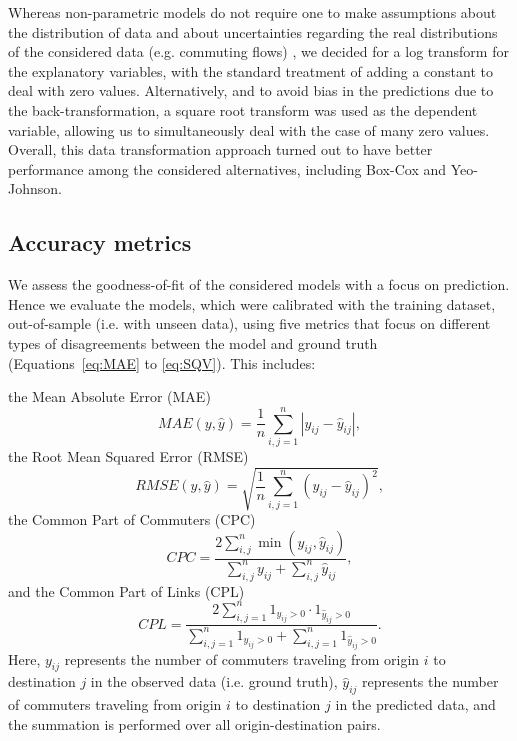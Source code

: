 Whereas non-parametric models do not require one to make assumptions about the distribution of data and about uncertainties regarding the real distributions of the considered data (e.g. commuting flows) \citep{Farmer2011CommutingTravel-to-work}, we decided for a log transform for the explanatory variables, with the standard treatment of adding a constant to deal with zero values. Alternatively, and to avoid bias in the predictions due to the back-transformation, a square root transform was used as the dependent variable, allowing us to simultaneously deal with the case of many zero values. Overall, this data transformation approach turned out to have better performance among the considered alternatives, including Box-Cox and Yeo-Johnson.

\subsection{Accuracy metrics}
\label{subsec:ETRC02H_accuracy_metrics}

We assess the goodness-of-fit of the considered models with a focus on prediction. Hence we evaluate the models, which were calibrated with the training dataset, out-of-sample (i.e. with unseen data), %
using five metrics that focus on different types of disagreements between the model and ground truth (Equations~\ref{eq:MAE} to \ref{eq:SQV}). This includes: %

the Mean Absolute Error (MAE)
\begin{equation}
\label{eq:MAE}
MAE(y,\hat{y}) = \frac{1}{n}\sum_{i,j=1}^{n}|y_{ij} - \hat{y}_{ij}|,
\end{equation}
the Root Mean Squared Error (RMSE)
\begin{equation}
\label{eq:ETRCI2H_RMSE}
RMSE(y,\hat{y}) = \sqrt{\frac{1}{n}\sum_{i,j=1}^{n}(y_{ij} - \hat{y}_{ij})^2},
\end{equation}
the Common Part of Commuters (CPC) 
\begin{equation}
\label{eq:CPC}
CPC=\frac {2\sum_{i,j}^n {\min (y_{ij},\hat{y}_{ij})} }{\sum_{i,j}^n {y_{ij}} +\sum_{i,j}^n {\hat{y}_{ij}}},
\end{equation}
and the Common Part of Links (CPL) 
\begin{equation}
\label{eq:CPL}
CPL=\frac{2\sum_{i,j=1}^{n} 1_{y_{ij} > 0}\cdot 1_{\hat{y}_{ij} > 0}}{\sum_{i,j=1}^{n}1_{y_{ij} > 0}+\sum_{i,j=1}^{n}1_{\hat{y}_{ij} > 0}} .
\end{equation}
Here, $y_{ij}$ represents the number of commuters traveling from origin $i$ to destination $j$ in the observed data (i.e. ground truth),  $\hat{y}_{ij}$ represents the number of commuters traveling from origin $i$ to destination $j$ in the predicted data, and the summation is performed over all origin-destination pairs. 


